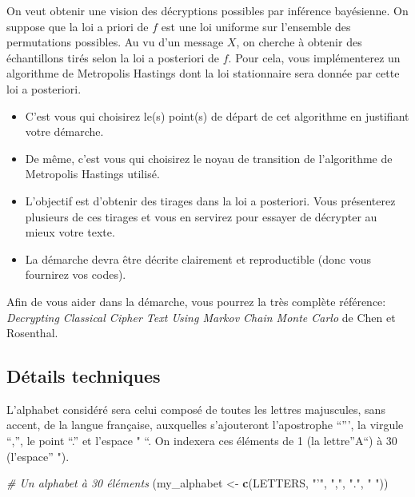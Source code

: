 \documentclass[]{article}
\newenvironment{Shaded}{\begin{snugshade}}{\end{snugshade}}
\newcommand{\CommentTok}[1]{\textcolor[rgb]{0.56,0.35,0.01}{\textit{#1}}}
\newcommand{\KeywordTok}[1]{\textcolor[rgb]{0.13,0.29,0.53}{\textbf{#1}}}
\newcommand{\NormalTok}[1]{#1}
\newcommand{\StringTok}[1]{\textcolor[rgb]{0.31,0.60,0.02}{#1}}
\providecommand{\tightlist}{%
  \setlength{\itemsep}{0pt}\setlength{\parskip}{0pt}}
\begin{document}
On veut obtenir une vision des décryptions possibles par inférence
bayésienne. On suppose que la loi a priori de \(f\) est une loi uniforme
sur l'ensemble des permutations possibles. Au vu d'un message \(X\), on
cherche à obtenir des échantillons tirés selon la loi a posteriori de
\(f\). Pour cela, vous implémenterez un algorithme de Metropolis
Hastings dont la loi stationnaire sera donnée par cette loi a
posteriori.

\begin{itemize}
\tightlist
\item
  C'est vous qui choisirez le(s) point(s) de départ de cet algorithme en
  justifiant votre démarche.
\item
  De même, c'est vous qui choisirez le noyau de transition de
  l'algorithme de Metropolis Hastings utilisé.
\item
  L'objectif est d'obtenir des tirages dans la loi a posteriori. Vous
  présenterez plusieurs de ces tirages et vous en servirez pour essayer
  de décrypter au mieux votre texte.
\item
  La démarche devra être décrite clairement et reproductible (donc vous
  fournirez vos codes).
\end{itemize}

Afin de vous aider dans la démarche, vous pourrez la très complète
référence: \emph{Decrypting Classical Cipher Text Using Markov Chain
Monte Carlo} de Chen et Rosenthal.

\hypertarget{duxe9tails-techniques}{%
\subsection{Détails techniques}\label{duxe9tails-techniques}}

L'alphabet considéré sera celui composé de toutes les lettres
majuscules, sans accent, de la langue française, auxquelles s'ajouteront
l'apostrophe ``''', la virgule ``,'', le point ``.'' et l'espace " ``.
On indexera ces éléments de 1 (la lettre''A``) à 30 (l'espace'' ").

\begin{Shaded}
\begin{Highlighting}[]
\CommentTok{# Un alphabet à 30 éléments}
\NormalTok{(my_alphabet <-}\StringTok{ }\KeywordTok{c}\NormalTok{(LETTERS, }\StringTok{"'"}\NormalTok{, }\StringTok{","}\NormalTok{, }\StringTok{"."}\NormalTok{, }\StringTok{" "}\NormalTok{))}
\end{Highlighting}
\end{Shaded}
\end{document}
